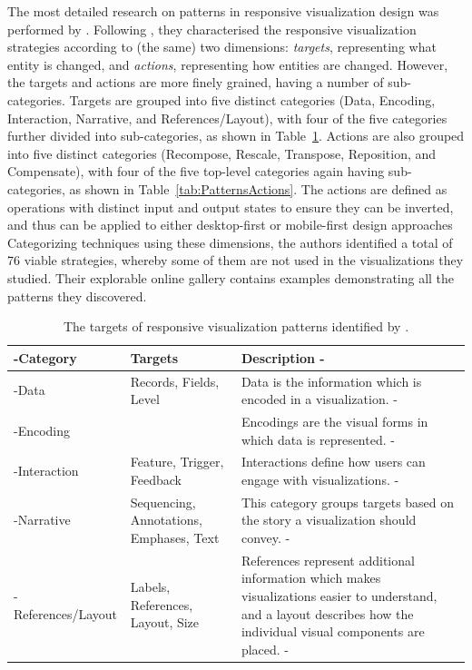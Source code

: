 The most detailed research on patterns in responsive visualization
design was performed by \textcite{DesignPatternsTradeOffsRespVis}.
Following \textcite{TechniquesForFlexibleRespVisDesign}, they
characterised the responsive visualization strategies according to
(the same) two dimensions: \emph{targets}, representing what entity is
changed, and \emph{actions}, representing how entities are changed.
However, the targets and actions are more finely grained, having a
number of sub-categories.
%
Targets are grouped into five distinct categories (Data, Encoding,
Interaction, Narrative, and References/Layout), with four of the five
categories further divided into sub-categories, as shown in
Table~\ref{tab:PatternsTargets}.
%
Actions are also grouped into five distinct categories (Recompose,
Rescale, Transpose, Reposition, and Compensate), with four of the five
top-level categories again having sub-categories, as shown in
Table~\ref{tab:PatternsActions}. The actions are defined as operations
with distinct input and output states to ensure they can be inverted,
and thus can be applied to either desktop-first or mobile-first design
approaches
%
Categorizing techniques using these dimensions, the authors identified
a total of 76 viable strategies, whereby some of them are not used in
the visualizations they studied. Their explorable online gallery
\parencite{DesignPatternsTradeOffsRespVisGallery} contains examples
demonstrating all the patterns they discovered.


\begin{table}[tp]
\tablestretch
{}
\centering
\begin{tabularx}{\linewidth}{>{\kern-\tabcolsep}l>{\raggedright}p{}X<{\kern-\tabcolsep}}
\toprule
Category & Targets & Description \\
\midrule
Data & Records, Fields, Level & Data is the information which is encoded in a visualization. \\
Encoding & & Encodings are the visual forms in which data is represented. \\
Interaction & Feature, Trigger, Feedback & Interactions define how users can engage with visualizations. \\
Narrative & Sequencing, Annotations, Emphases, Text & This category groups targets based on the story a visualization should convey. \\
References/Layout & Labels, References, Layout, Size & References represent additional information which makes visualizations easier to understand, and a layout describes how the individual visual components are placed. \\
\bottomrule
\end{tabularx}
\caption[Targets of Responsive Visualization Patterns]{
The targets of responsive visualization patterns identified by
\textcite{DesignPatternsTradeOffsRespVis}.
}
\label{tab:PatternsTargets}
\end{table}




